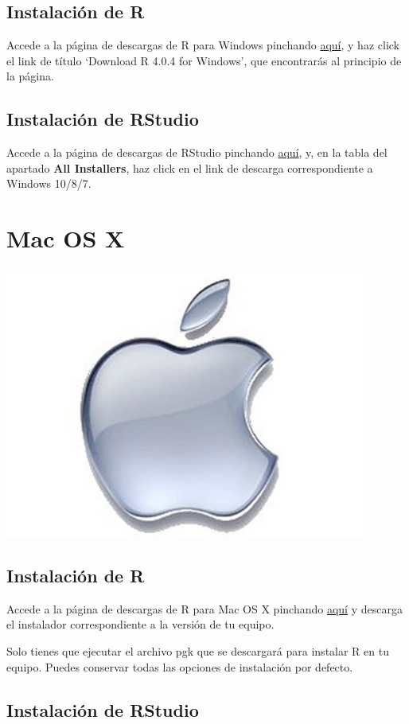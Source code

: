 \documentclass[spanish,]{article}
\begin{document}
\hypertarget{instalaciuxf3n-de-r-1}{%
\subsection{Instalación de R}\label{instalaciuxf3n-de-r-1}}

Accede a la página de descargas de R para Windows pinchando \href{https://ftp.cixug.es/CRAN/bin/windows/base/}{aquí}, y haz click el link de título `Download R 4.0.4 for Windows', que encontrarás al principio de la página.

\hypertarget{instalaciuxf3n-de-rstudio-1}{%
\subsection{Instalación de RStudio}\label{instalaciuxf3n-de-rstudio-1}}

Accede a la página de descargas de RStudio pinchando \href{https://rstudio.com/products/rstudio/download/\#download}{aquí}, y, en la tabla del apartado \textbf{All Installers}, haz click en el link de descarga correspondiente a Windows 10/8/7.

\hypertarget{mac}{%
\section{Mac OS X}\label{mac}}

\begin{center}\includegraphics[width=0.15\linewidth]{images/os/apple} \end{center}

\hypertarget{instalaciuxf3n-de-r-2}{%
\subsection{Instalación de R}\label{instalaciuxf3n-de-r-2}}

Accede a la página de descargas de R para Mac OS X pinchando \href{https://ftp.cixug.es/CRAN/bin/macosx/}{aquí} y descarga el instalador correspondiente a la versión de tu equipo.

Solo tienes que ejecutar el archivo pgk que se descargará para instalar R en tu equipo. Puedes conservar todas las opciones de instalación por defecto.

\hypertarget{instalaciuxf3n-de-rstudio-2}{%
\subsection{Instalación de RStudio}\label{instalaciuxf3n-de-rstudio-2}}
\end{document}
